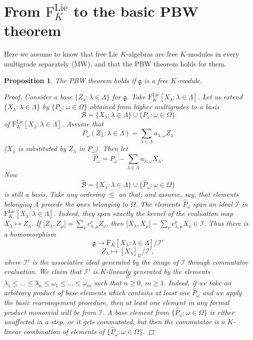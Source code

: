 \documentclass[11pt,a4paper]{amsart}
\newcommand{\plabel}[1]{ \label{#1}}
\newcommand{\plabel}[1]{ \label{#1}\rlap{\smash{${}^{^{[#1]}}$}}}
\newcommand{\plabel}[1]{ \label{#1}}
\DeclareMathOperator{\Lie}{Lie}
\newcommand{\bo}{\boldsymbol}
\theoremstyle{definition}
\theoremstyle{plain}
\newtheorem{prop}[point]{Proposition}
\begin{document}
\section{From $\mathrm F_{K}^{\Lie}$ to the basic PBW theorem}\plabel{sec:freefrom}
Here we assume to know that free Lie $K$-algebras are  free $K$-modules in every multigrade separately (MW),
 and that the PBW theorem holds for them.
\begin{prop}
The PBW theorem holds if $\mathfrak g$ is a free $K$-module.
\begin{proof}
Consider a base $\{Z_\lambda:\lambda\in\Lambda\}$ for $\mathfrak g$.
Take $\mathrm F^{\Lie}_K[X_\lambda:\lambda\in\Lambda]$.
Let us extend $\{X_\lambda:\lambda\in\Lambda\}$ by $\{P_\omega:\omega\in\Omega\}$
 obtained from higher multigrades to a basis
\[\mathcal B=\{X_\lambda:\lambda\in\Lambda\}\cup\{P_\omega:\omega\in\Omega\}\]
 of $\mathrm F^{\Lie}_K[X_\lambda:\lambda\in\Lambda]$.
Assume that
\[P_\omega(Z_\lambda:\lambda\in\Lambda)=\sum_{\lambda\in \Lambda}a_{\lambda,\omega}Z_\lambda\]
 ($X_\lambda$ is substituted by $Z_\lambda$ in $P_\omega$). Then let
\[\hat P_\omega=P_\omega-\sum_{\lambda\in \Lambda}a_{\lambda,\omega}X_\lambda.\]
Now
\[\hat{\mathcal B}=\{X_\lambda:\lambda\in\Lambda\}\cup\{\hat P_\omega:\omega\in\Omega\}\]
 is still a basis.
Take any ordering $\leq$ on that; and assume, say, that elements belonging $\Lambda$ precede the ones belonging to $\Omega$.
The elements $\hat P_\omega$  span an ideal $\mathcal I$ in $\mathrm F^{\Lie}_K[X_\lambda:\lambda\in\Lambda]$.
Indeed, they span exactly the kernel of the evaluation map $X_\lambda\mapsto Z_\lambda$.
If $\bo[Z_\lambda,Z_\mu\bo]=\sum_\nu c_{\lambda,\mu}^\nu Z_{\nu}$,
 then $\bo[X_\lambda,X_\mu\bo]-\sum_\nu c_{\lambda,\mu}^\nu X_{\nu}\in \mathcal I$.
Thus   there is a homomorphism
\[\mathfrak g\rightarrow\mathrm  F_K[X_\lambda:\lambda\in\Lambda]/\mathcal I'\]
\[Z_\lambda\mapsto [X_\lambda]_{\mathcal U}/\mathcal I',\]
 where $\mathcal I'$ is the associative ideal generated by the image of $\mathcal I$ through commutator evaluation.
We claim that $\mathcal I'$ is $K$-linearly generated by the elements
\begin{equation}[X_{\lambda_1}\ldots X_{\lambda_n}\hat P_{\omega_1}\ldots\hat P_{\omega_m}]_{\mathcal U} \plabel{eq:gog}
\end{equation}
 $\lambda_1\leq\ldots\leq\lambda_n\leq \omega_1\leq\ldots\leq\omega_m$ such that $n\geq 0$, $m\geq 1$.
Indeed, if we take an arbitrary product of base elements which contains at least one $\hat P_\omega$ and we
 apply the basic rearrangement procedure, then at least one element in any  formal product monomial will be from $\mathcal I$.
A base element from $\{\hat P_\omega:\omega\in\Omega\}$ is either unaffected in a step, or it gets com\-mu\-ta\-ted,
 but then the commutator is a $K$-linear combination of elements of $\{\hat P_\omega:\omega\in\Omega\}$.


\end{proof}
\end{prop}
\end{document}
